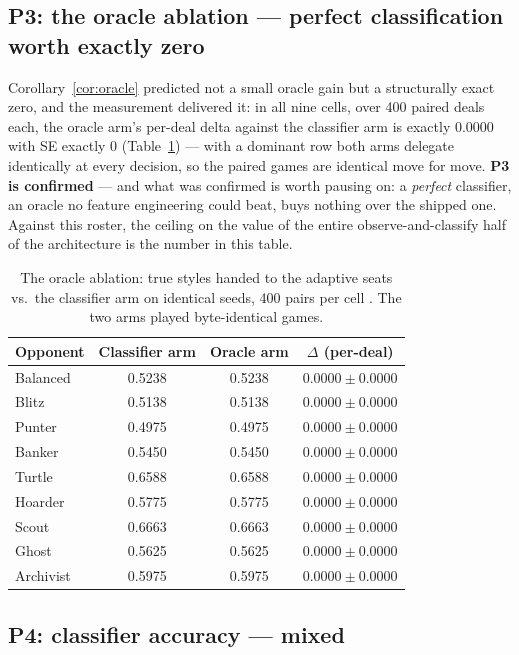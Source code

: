 \documentclass[11pt]{article}
\begin{document}
\subsection{P3: the oracle ablation --- perfect classification worth exactly zero}
\label{sec:oracle}

Corollary~\ref{cor:oracle} predicted not a small oracle gain but a structurally exact
zero, and the measurement delivered it: in all nine cells, over 400 paired deals each, the
oracle arm's per-deal delta against the classifier arm is exactly $0.0000$ with SE exactly
$0$ (Table~\ref{tab:oracle}) --- with a dominant row both arms delegate identically at
every decision, so the paired games are identical move for move. \textbf{P3 is confirmed}
--- and what was confirmed is worth pausing on: a \emph{perfect} classifier, an oracle no
feature engineering could beat, buys nothing over the shipped one. Against this roster,
the ceiling on the value of the entire observe-and-classify half of the architecture is
the number in this table.

\begin{table}[t]
\centering
\caption{The oracle ablation: true styles handed to the adaptive seats vs.\ the classifier
arm on identical seeds, 400 pairs per cell \cite{artifact}. The two arms played
byte-identical games.}
\label{tab:oracle}
\footnotesize
\begin{tabular}{@{}lccc@{}}
\toprule
Opponent & Classifier arm & Oracle arm & $\Delta$ (per-deal) \\
\midrule
Balanced  & 0.5238 & 0.5238 & $0.0000 \pm 0.0000$ \\
Blitz     & 0.5138 & 0.5138 & $0.0000 \pm 0.0000$ \\
Punter    & 0.4975 & 0.4975 & $0.0000 \pm 0.0000$ \\
Banker    & 0.5450 & 0.5450 & $0.0000 \pm 0.0000$ \\
Turtle    & 0.6588 & 0.6588 & $0.0000 \pm 0.0000$ \\
Hoarder   & 0.5775 & 0.5775 & $0.0000 \pm 0.0000$ \\
Scout     & 0.6663 & 0.6663 & $0.0000 \pm 0.0000$ \\
Ghost     & 0.5625 & 0.5625 & $0.0000 \pm 0.0000$ \\
Archivist & 0.5975 & 0.5975 & $0.0000 \pm 0.0000$ \\
\bottomrule
\end{tabular}
\end{table}

\subsection{P4: classifier accuracy --- mixed}
\label{sec:p4}
\end{document}
